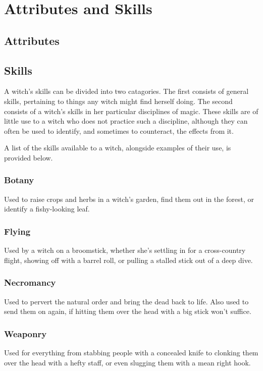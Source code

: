 \chapter{Attributes and Skills}

\section{Attributes}

\section{Skills}



A witch's skills can be divided into two catagories.
The first consists of general skills, pertaining to things any witch might find herself doing.
The second consists of a witch's skills in her particular disciplines of magic.
These skills are of little use to a witch who does not practice such a discipline, although they can often be used to identify, and sometimes to counteract, the effects from it.

A list of the skills available to a witch, alongside examples of their use, is provided below.

\subsection{Botany}

Used to raise crops and herbs in a witch's garden, find them out in the forest, or identify a fishy-looking leaf.

\subsection{Flying}

Used by a witch on a broomstick, whether she's settling in for a cross-country flight, showing off with a barrel roll, or pulling a stalled stick out of a deep dive.

\subsection{Necromancy}

Used to pervert the natural order and bring the dead back to life.
Also used to send them on again, if hitting them over the head with a big stick won't suffice.

\subsection{Weaponry}

Used for everything from stabbing people with a concealed knife to clonking them over the head with a hefty staff, or even slugging them with a mean right hook.
